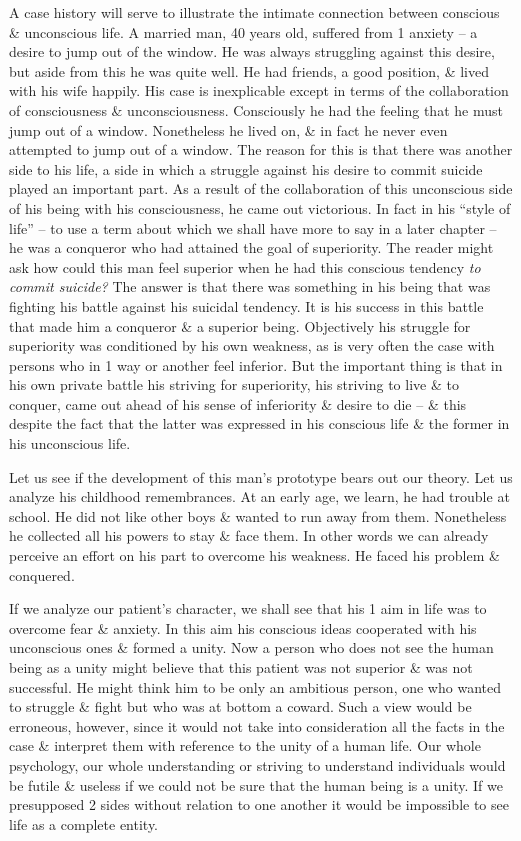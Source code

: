\documentclass{article}
\numberwithin{equation}{section}
\begin{document}
A case history will serve to illustrate the intimate connection between conscious \& unconscious life. A married man, 40 years old, suffered from 1 anxiety -- a desire to jump out of the window. He was always struggling against this desire, but aside from this he was quite well. He had friends, a good position, \& lived with his wife happily. His case is inexplicable except in terms of the collaboration of consciousness \& unconsciousness. Consciously he had the feeling that he must jump out of a window. Nonetheless he lived on, \& in fact he never even attempted to jump out of a window. The reason for this is that there was another side to his life, a side in which a struggle against his desire to commit suicide played an important part. As a result of the collaboration of this unconscious side of his being with his consciousness, he came out victorious. In fact in his ``style of life'' -- to use a term about which we shall have more to say in a later chapter -- he was a conqueror who had attained the goal of superiority. The reader might ask how could this man feel superior when he had this conscious tendency \textit{to commit suicide?} The answer is that there was something in his being that was fighting his battle against his suicidal tendency. It is his success in this battle that made him a conqueror \& a superior being. Objectively his struggle for superiority was conditioned by his own weakness, as is very often the case with persons who in 1 way or another feel inferior. But the important thing is that in his own private battle his striving for superiority, his striving to live \& to conquer, came out ahead of his sense of inferiority \& desire to die -- \& this despite the fact that the latter was expressed in his conscious life \& the former in his unconscious life.

Let us see if the development of this man's prototype bears out our theory. Let us analyze his childhood remembrances. At an early age, we learn, he had trouble at school. He did not like other boys \& wanted to run away from them. Nonetheless he collected all his powers to stay \& face them. In other words we can already perceive an effort on his part to overcome his weakness. He faced his problem \& conquered.

If we analyze our patient's character, we shall see that his 1 aim in life was to overcome fear \& anxiety. In this aim his conscious ideas cooperated with his unconscious ones \& formed a unity. Now a person who does not see the human being as a unity might believe that this patient was not superior \& was not successful. He might think him to be only an ambitious person, one who wanted to struggle \& fight but who was at bottom a coward. Such a view would be erroneous, however, since it would not take into consideration all the facts in the case \& interpret them with reference to the unity of a human life. Our whole psychology, our whole understanding or striving to understand individuals would be futile \& useless if we could not be sure that the human being is a unity. If we presupposed 2 sides without relation to one another it would be impossible to see life as a complete entity.
\end{document}
